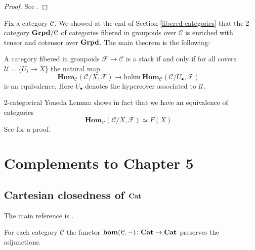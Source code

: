 \begin{refsection}
\begin{proof}
See \cite[Thm 4.3]{hollander}.
\end{proof}


Fix a category $\mathcal C$. We showed at the end of Section \ref{fibered categories} that the 2-category $\mathbf{Grpd} / \mathcal C$ of categories fibered in groupoids over $\mathcal C$ is enriched with tensor and cotensor over $\mathbf{Grpd}$. The main theorem is the following:

\begin{thm} \label{thm homotopical descent condition 1}
A category fibered in groupoids $\mathcal F \to \mathcal C$ is a stack if and only if for all covers $\mathcal U = \{U_i \to X\}$ the natural map
\[
\mathbf{Hom}_{\mathcal C}(\mathcal C / X, \mathcal F) \to \mathrm{holim} \: \mathbf{Hom}_{\mathcal C}(\mathcal C / U_\bullet, \mathcal F)
\]
is an equivalence. Here $U_\bullet$ denotes the hypercover associated to $\mathcal U$.
\end{thm}

\begin{rmk}
2-categorical Yoneda Lemma shows in fact that we have an equivalence of categories
\[
\mathbf{Hom}_{\mathcal C}(\mathcal C / X, \mathcal F) \simeq F(X)
\]
See \cite[Ch. 3.6.2]{vistoli} for a proof.
\end{rmk}

\section{Complements to Chapter 5}

\subsection{Cartesian closedness of $\mathbf{Cat}$}

The main reference is \cite[Ch. VI]{sga1}.

\begin{lemma} \label{lemma internal hom adjunctions}
For each category $\mathcal C$ the functor $\mathbf{hom}(\mathcal C, -) \colon \mathbf{Cat} \to \mathbf{Cat}$ preserves the adjunctions.
\end{lemma}

\printbibliography[heading = local]

\end{refsection}
